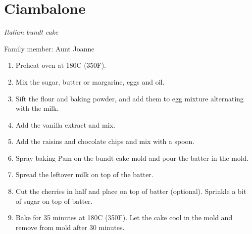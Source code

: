 \chapter{Ciambalone}
\label{ch:ciambalone}


\textit{Italian bundt cake}

Family member: Aunt Joanne

\begin{enumerate}
    \item Preheat oven at 180\degree C (350\degree F).
    \item Mix the sugar, butter or margarine, eggs and oil.
    \item Sift the flour and baking powder, and add them to egg mixture alternating with the milk.
    \item Add the vanilla extract and mix.
    \item Add the raisins and chocolate chips and mix with a spoon.
    \item Spray baking Pam on the bundt cake mold and pour the batter in the mold.
    \item Spread the leftover milk on top of the batter.
    \item Cut the cherries in half and place on top of batter (optional). Sprinkle a bit of sugar on top of batter.
    \item Bake for 35 minutes at 180\degree C (350\degree F). Let the cake cool in the mold and remove from mold after 30 minutes.
\end{enumerate}


